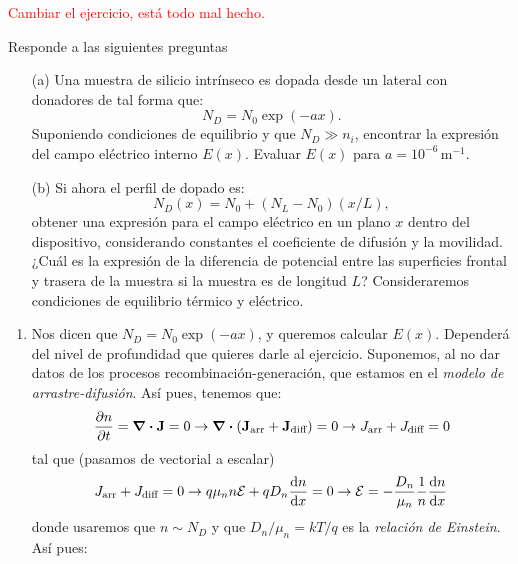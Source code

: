 \begin{Anotacion}
	\textcolor{red}{Cambiar el ejercicio, está todo mal hecho.}
\end{Anotacion}



\begin{texercise}
	Responde a las siguientes preguntas
	\begin{itemize}
		\item[(a)] Una muestra de silicio intrínseco es dopada desde un lateral con donadores de tal forma que:
		      \[
			      N_D = N_0 \exp(-ax).
		      \]
		      Suponiendo condiciones de equilibrio y que \(N_D \gg n_i\), encontrar la expresión del campo eléctrico interno \(E(x)\). Evaluar \(E(x)\) para \(a = 10^{-6} \, \text{m}^{-1}\).
		\item[(b)] Si ahora el perfil de dopado es:
		      \[
			      N_D(x) = N_0+(N_L-N_0)(x/L),
		      \]
		      obtener una expresión para el campo eléctrico en un plano \(x\) dentro del dispositivo, considerando constantes el coeficiente de difusión y la movilidad. ¿Cuál es la expresión de la diferencia de potencial entre las superficies frontal y trasera de la muestra si la muestra es de longitud \(L\)? Consideraremos condiciones de equilibrio térmico y eléctrico.
	\end{itemize}

	\tcblower
	\begin{enumerate}[label=\alph*)]
		\item Nos dicen que $N_D=N_0 \exp(-ax)$, y queremos calcular $E(x)$. Dependerá del nivel de profundidad que quieres darle al ejercicio. Suponemos, al no dar datos de los procesos recombinación-generación, que estamos en el \textit{modelo de arrastre-difusión}. Así pues, tenemos que:
		\begin{equation}
			\frac{\partial n}{\partial t} = \div \mathbf{J} = 0 \rightarrow \div (\mathbf{J}_{\text{arr}}+\mathbf{J}_{\text{diff}}) = 0 \rightarrow J_{\text{arr}}+J_{\text{diff}} = 0
		\end{equation}
		tal que (pasamos de vectorial a escalar)
		\begin{equation}
			J_{\text{arr}}+J_{\text{diff}} = 0 \rightarrow q \mu_n n \mathcal{E} + q D_n \frac{\mathrm{d} n}{\mathrm{d} x} = 0 \rightarrow \mathcal{E} = - \frac{D_n}{\mu_n} \frac{1}{n} \frac{\mathrm{d} n}{\mathrm{d} x}
		\end{equation}
		donde usaremos que $n\sim N_D$ y que $D_n / \mu_n = kT/q$ es la \textit{relación de Einstein}. Así pues:


\end{enumerate}
\end{texercise}
